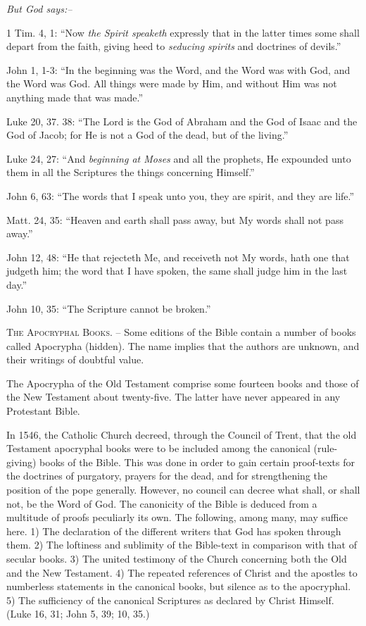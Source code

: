 \documentclass[
]{book}
\def\igobble#1{}
\begin{document}
\begin{center}
\textsl{But God says:--}
\end{center}

1 Tim. 4, 1: ``Now \emph{the Spirit speaketh} expressly that in the latter times some shall depart from the faith, giving heed to \emph{seducing spirits} and doctrines of devils.''

John 1, 1-3: ``In the beginning was the Word, and the Word was with God, and the Word was God. All things were made by Him, and without Him was not anything made that was made.''

Luke 20, 37. 38: ``The Lord is the God of Abraham and the God of Isaac and the God of Jacob; for He is not a God of the dead, but of the living.''

Luke 24, 27: ``And \emph{beginning at Moses} and all the prophets, He expounded unto them in all the Scriptures the things concerning Himself.''

John 6, 63: ``The words that I speak unto you, they are spirit, and they are life.''

Matt. 24, 35: ``Heaven and earth shall pass away, but My words shall not pass away.''

John 12, 48: ``He that rejecteth Me, and receiveth not My words, hath one that judgeth him; the word that I have spoken, the same shall judge him in the last day.''

John 10, 35: ``The Scripture cannot be broken.''

\textsc{The Apocryphal Books.} -- Some editions of the Bible contain a number of books called Apocrypha (hidden). The name implies that the authors are unknown, and their writings of doubtful value.

The Apocrypha of the Old Testament comprise some fourteen books and those of the New Testament about twenty-five. The latter have never appeared in any Protestant Bible.

In 1546, the Catholic Church\index{Catholic Church!zzzzz@\igobble|seealso{Roman Catholic Church}} decreed, through the Council of Trent, that the old Testament apocryphal books were to be included among the canonical (rule-giving) books of the Bible. This was done in order to gain certain proof-texts for the doctrines of purgatory, prayers for the dead, and for strengthening the position of the pope generally. However, no council can decree what shall, or shall not, be the Word of God. The canonicity of the Bible is deduced from a multitude of proofs peculiarly its own. The following, among many, may suffice here. 1) The declaration of the different writers that God has spoken through them. 2) The loftiness and sublimity of the Bible-text in comparison with that of secular books. 3) The united testimony of the Church concerning both the Old and the New Testament. 4) The repeated references of Christ and the apostles to numberless statements in the canonical books, but silence as to the apocryphal. 5) The sufficiency of the canonical Scriptures as declared by Christ Himself. (Luke 16, 31; John 5, 39; 10, 35.)
\end{document}
